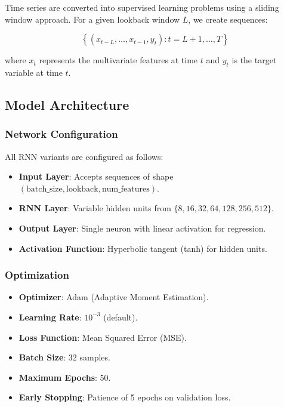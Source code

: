 \documentclass[conference]{IEEEtran}
\begin{document}
Time series are converted into supervised learning problems using a
sliding window approach. For a given lookback window $L$, we create
sequences:

\begin{equation}
\left\{
(x_{t-L}, \ldots, x_{t-1}, y_t)
:
t = L+1, \ldots, T
\right\}
\end{equation}

where $x_t$ represents the multivariate features at time $t$ and
$y_t$ is the target variable at time $t$.

\subsection{Model Architecture}

\subsubsection{Network Configuration}

All RNN variants are configured as follows:

\begin{itemize}
    \item \textbf{Input Layer}: Accepts sequences of shape
    $(\text{batch\_size}, \text{lookback}, \text{num\_features})$.
    
    \item \textbf{RNN Layer}: Variable hidden units from
    $\{8,16,32,64,128,256,512\}$.
    
    \item \textbf{Output Layer}: Single neuron with linear activation for regression.
    
    \item \textbf{Activation Function}: Hyperbolic tangent (tanh) for hidden units.
\end{itemize}

\subsubsection{Optimization}

\begin{itemize}
    \item \textbf{Optimizer}: Adam (Adaptive Moment Estimation).
    \item \textbf{Learning Rate}: $10^{-3}$ (default).
    \item \textbf{Loss Function}: Mean Squared Error (MSE).
    \item \textbf{Batch Size}: 32 samples.
    \item \textbf{Maximum Epochs}: 50.
    \item \textbf{Early Stopping}: Patience of 5 epochs on
    validation loss.
\end{itemize}
\end{document}

